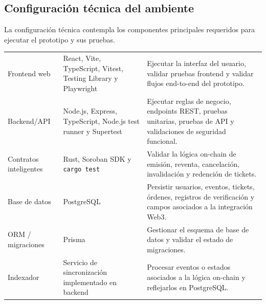 \documentclass[12pt,letterpaper]{article}
\begin{document}
\subsection{Configuración técnica del ambiente}

La configuración técnica contempla los componentes principales requeridos para ejecutar el prototipo y sus pruebas.

\begin{table}[H]
\centering

\begingroup
\scriptsize
\setlength{\tabcolsep}{3pt}
\renewcommand{\arraystretch}{1.22}

\begin{tabularx}{\textwidth}{|
>{\raggedright\arraybackslash}p{3.4cm}|
>{\raggedright\arraybackslash}p{4.7cm}|
>{\raggedright\arraybackslash}X|}
\hline
\multicolumn{1}{|>{\centering\arraybackslash}m{3.4cm}|}{\textbf{Componente}} &
\multicolumn{1}{>{\centering\arraybackslash}m{4.7cm}|}{\textbf{Tecnología / herramienta}} &
\multicolumn{1}{>{\centering\arraybackslash}m{6.3cm}|}{\textbf{Propósito en pruebas}} \\
\hline

Frontend web &
React, Vite, TypeScript, Vitest, Testing Library y Playwright &
Ejecutar la interfaz del usuario, validar pruebas frontend y validar flujos end-to-end del prototipo. \\
\hline

Backend/API &
Node.js, Express, TypeScript, Node.js test runner y Supertest &
Ejecutar reglas de negocio, endpoints REST, pruebas unitarias, pruebas de API y validaciones de seguridad funcional. \\
\hline

Contratos inteligentes &
Rust, Soroban SDK y \texttt{cargo test} &
Validar la lógica on-chain de emisión, reventa, cancelación, invalidación y redención de tickets. \\
\hline

Base de datos &
PostgreSQL &
Persistir usuarios, eventos, tickets, órdenes, registros de verificación y campos asociados a la integración Web3. \\
\hline

ORM / migraciones &
Prisma &
Gestionar el esquema de base de datos y validar el estado de migraciones. \\
\hline

Indexador &
Servicio de sincronización implementado en backend &
Procesar eventos o estados asociados a la lógica on-chain y reflejarlos en PostgreSQL. \\
\hline


\end{tabularx}
\end{table}
\end{document}
